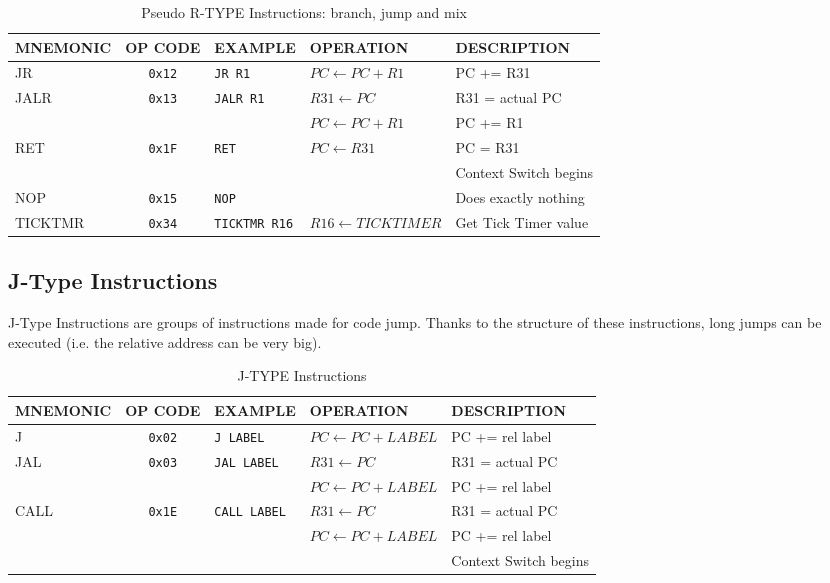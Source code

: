 \begin{table}[H]
\begin{tabularx}{\textwidth}{|l|c|l|l|X|}
    \hline
    MNEMONIC & OP CODE & EXAMPLE & OPERATION & DESCRIPTION \\ 
    \hline
    JR & \texttt{0x12} & \texttt{JR R1} & $PC \leftarrow PC + R1$ & PC += R31\\ 
    \hline
    JALR & \texttt{0x13} & \texttt{JALR R1} & $R31 \leftarrow PC $ & R31 = actual PC\\ 
    & & & $PC \leftarrow PC + R1$ & PC += R1\\ 
    \hline
    RET & \texttt{0x1F} & \texttt{RET} & $PC \leftarrow R31$ & PC = R31\\ 
    & & & & Context Switch begins\\ 
    \hline
    NOP & \texttt{0x15} & \texttt{NOP} & & Does exactly nothing\\ 
    \hline
    TICKTMR & \texttt{0x34} & \texttt{TICKTMR R16} &  $R16 \leftarrow TICK TIMER $ & Get Tick Timer value\\ 
    \hline
\end{tabularx}
\caption{Pseudo R-TYPE Instructions: branch, jump and mix}
\label{table:r_type_jump}
\end{table}

\subsection{J-Type Instructions}

J-Type Instructions are groups of instructions made for code jump. Thanks to the structure of these instructions, long jumps can be executed (i.e. the relative address can be very big).

\begin{table}[H]
\begin{tabularx}{\textwidth}{|l|c|l|l|X|}
    \hline
    MNEMONIC & OP CODE & EXAMPLE & OPERATION & DESCRIPTION \\ 
    \hline
    J & \texttt{0x02} & \texttt{J LABEL} & $PC \leftarrow PC + LABEL$ & PC += rel label\\ 
    \hline
    JAL & \texttt{0x03} & \texttt{JAL LABEL} & $R31 \leftarrow PC $ & R31 = actual PC\\ 
    & & & $PC \leftarrow PC + LABEL$ & PC += rel label\\ 
    \hline
    CALL & \texttt{0x1E} & \texttt{CALL LABEL} & $R31 \leftarrow PC $ & R31 = actual PC\\ 
    & & & $PC \leftarrow PC + LABEL$ & PC += rel label\\ 
    & & & & Context Switch begins\\ 
    \hline
\end{tabularx}
\caption{J-TYPE Instructions}
\label{table:j_type}
\end{table}

